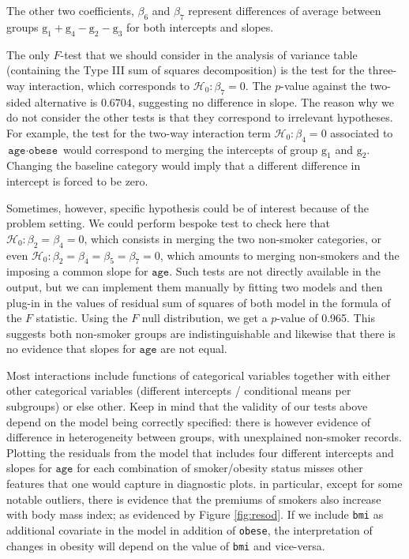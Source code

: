 \documentclass[
  11pt,
  letterpaper,
]{book}
\theoremstyle{definition}
\theoremstyle{definition}
\theoremstyle{definition}
\theoremstyle{remark}
\begin{document}
The other two coefficients, \(\beta_6\) and \(\beta_7\) represent differences of average between groups \(\mathrm{g}_1 + \mathrm{g}_4 - \mathrm{g}_2 - \mathrm{g}_3\) for both intercepts and slopes.

The only \(F\)-test that we should consider in the analysis of variance table (containing the Type III sum of squares decomposition) is the test for the three-way interaction, which corresponds to \(\mathscr{H}_0: \beta_7=0\). The \(p\)-value against the two-sided alternative is \(0.6704\), suggesting no difference in slope. The reason why we do not consider the other tests is that they correspond to irrelevant hypotheses. For example, the test for the two-way interaction term \(\mathscr{H}_0: \beta_4=0\) associated to \(\texttt{age} \cdot \texttt{obese}\) would correspond to merging the intercepts of group \(\mathrm{g}_1\) and \(\mathrm{g}_2\). Changing the baseline category would imply that a different difference in intercept is forced to be zero.

Sometimes, however, specific hypothesis could be of interest because of the problem setting. We could perform bespoke test to check here that \(\mathscr{H}_0: \beta_2=\beta_4=0\), which consists in merging the two non-smoker categories, or even \(\mathscr{H}_0: \beta_2=\beta_4= \beta_5=\beta_7=0\), which amounts to merging non-smokers and the imposing a common slope for \(\texttt{age}\). Such tests are not directly available in the output, but we can implement them manually by fitting two models and then plug-in in the values of residual sum of squares of both model in the formula of the \(F\) statistic. Using the \(F\) null distribution, we get a \(p\)-value of 0.965. This suggests both non-smoker groups are indistinguishable and likewise that there is no evidence that slopes for \(\texttt{age}\) are not equal.

Most interactions include functions of categorical variables together with either other categorical variables (different intercepts / conditional means per subgroups) or else other. Keep in mind that the validity of our tests above depend on the model being correctly specified: there is however evidence of difference in heterogeneity between groups, with unexplained non-smoker records. Plotting the residuals from the model that includes four different intercepts and slopes for \(\texttt{age}\) for each combination of smoker/obesity status misses other features that one would capture in diagnostic plots. in particular, except for some notable outliers, there is evidence that the premiums of smokers also increase with body mass index; as evidenced by Figure \ref{fig:resod}. If we include \texttt{bmi} as additional covariate in the model in addition of \texttt{obese}, the interpretation of changes in obesity will depend on the value of \texttt{bmi} and vice-versa.
\end{document}
